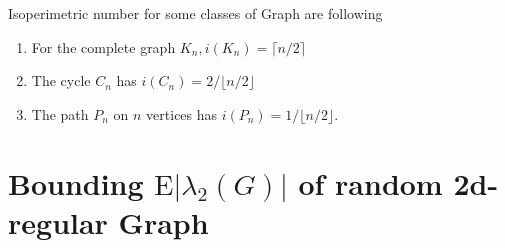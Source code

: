 \documentclass[oneside]{book}
\newtheorem{mydef}{Definition}[section]
\begin{document}
	
	Isoperimetric number for some classes of Graph are following \par
	\begin{enumerate}
		\item   For the complete graph $K_{n}, i\left(K_{n}\right)=\lceil n / 2\rceil$ \par
		\item The cycle $C_{n}$ has $i\left(C_{n}\right)=2 /\lfloor n / 2\rfloor$ \par
		\item  The path $P_{n}$ on $n$ vertices has $i\left(P_{n}\right)=1 /\lfloor n / 2\rfloor$.
	\end{enumerate}

\newpage
	\section{Bounding $\mathrm{E}\left|\lambda_{2}(G)\right|$ of random 2d-regular Graph}
	\label{s:6 }
	
\end{document}
